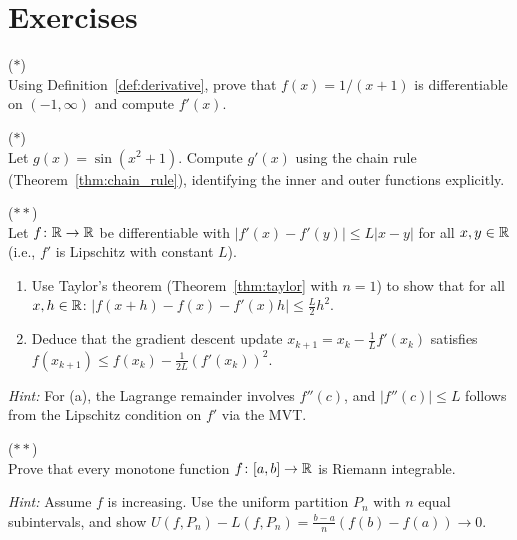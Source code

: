 \documentclass[11pt,a4paper]{article}
\begin{document}
\section{Exercises}
\label{sec:exercises}

\begin{exercise}
\textnormal{(\(*\))} \\
Using Definition~\ref{def:derivative}, prove that $f(x) = 1/(x+1)$ is
differentiable on $(-1, \infty)$ and compute $f'(x)$.
\end{exercise}

\begin{exercise}
\textnormal{(\(*\))} \\
Let $g(x) = \sin(x^2 + 1)$. Compute $g'(x)$ using the chain rule
(Theorem~\ref{thm:chain_rule}), identifying the inner and outer
functions explicitly.
\end{exercise}

\begin{exercise}
\textnormal{(\(**\))} \\
Let $f \colon \mathbb{R} \to \mathbb{R}$ be differentiable with $|f'(x) - f'(y)| \le
L|x - y|$ for all $x, y \in \mathbb{R}$ (i.e., $f'$ is Lipschitz with
constant $L$).
\begin{enumerate}[nosep,label=(\alph*)]
  \item Use Taylor's theorem (Theorem~\ref{thm:taylor} with $n = 1$) to
    show that for all $x, h \in \mathbb{R}$:
    $|f(x + h) - f(x) - f'(x)h| \le \frac{L}{2}h^2$.
  \item Deduce that the gradient descent update $x_{k+1} = x_k -
    \frac{1}{L} f'(x_k)$ satisfies
    $f(x_{k+1}) \le f(x_k) - \frac{1}{2L}(f'(x_k))^2$.
\end{enumerate}
\textit{Hint:} For (a), the Lagrange remainder involves $f''(c)$, and
$|f''(c)| \le L$ follows from the Lipschitz condition on $f'$ via the
MVT.
\end{exercise}

\begin{exercise}
\textnormal{(\(**\))} \\
Prove that every monotone function $f \colon [a, b] \to \mathbb{R}$ is Riemann
integrable.

\textit{Hint:} Assume $f$ is increasing. Use the uniform partition
$P_n$ with $n$ equal subintervals, and show
$U(f, P_n) - L(f, P_n) = \frac{b-a}{n}(f(b) - f(a)) \to 0$.
\end{exercise}
\end{document}
